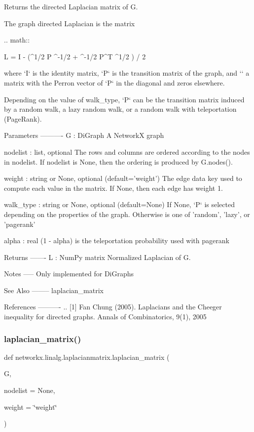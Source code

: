 \begin{DoxyVerb}Returns the directed Laplacian matrix of G.

The graph directed Laplacian is the matrix

.. math::

    L = I - (\Phi^{1/2} P \Phi^{-1/2} + \Phi^{-1/2} P^T \Phi^{1/2} ) / 2

where `I` is the identity matrix, `P` is the transition matrix of the
graph, and `\Phi` a matrix with the Perron vector of `P` in the diagonal and
zeros elsewhere.

Depending on the value of walk_type, `P` can be the transition matrix
induced by a random walk, a lazy random walk, or a random walk with
teleportation (PageRank).

Parameters
----------
G : DiGraph
   A NetworkX graph

nodelist : list, optional
   The rows and columns are ordered according to the nodes in nodelist.
   If nodelist is None, then the ordering is produced by G.nodes().

weight : string or None, optional (default='weight')
   The edge data key used to compute each value in the matrix.
   If None, then each edge has weight 1.

walk_type : string or None, optional (default=None)
   If None, `P` is selected depending on the properties of the
   graph. Otherwise is one of 'random', 'lazy', or 'pagerank'

alpha : real
   (1 - alpha) is the teleportation probability used with pagerank

Returns
-------
L : NumPy matrix
  Normalized Laplacian of G.

Notes
-----
Only implemented for DiGraphs

See Also
--------
laplacian_matrix

References
----------
.. [1] Fan Chung (2005).
   Laplacians and the Cheeger inequality for directed graphs.
   Annals of Combinatorics, 9(1), 2005
\end{DoxyVerb}
 \mbox{\label{namespacenetworkx_1_1linalg_1_1laplacianmatrix_a74be88be72c1aafd144a63202df9e77f}} 
\subsubsection{\texorpdfstring{laplacian\+\_\+matrix()}{laplacian\_matrix()}}
{\footnotesize\ttfamily def networkx.\+linalg.\+laplacianmatrix.\+laplacian\+\_\+matrix (\begin{DoxyParamCaption}\item[{}]{G,  }\item[{}]{nodelist = {\ttfamily None},  }\item[{}]{weight = {\ttfamily \char`\"{}weight\char`\"{}} }\end{DoxyParamCaption})}

